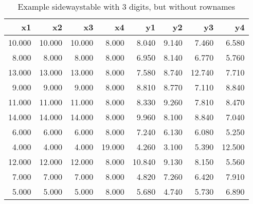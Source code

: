 \documentclass[10pt, fullpage, a4paper, titlepage]{article}
\begin{document}
 
\begin{sidewaystable}[ht]
\centering
\begin{tabular}{rrrrrrrr}
  \hline
x1 & x2 & x3 & x4 & y1 & y2 & y3 & y4 \\ 
  \hline
10.000 & 10.000 & 10.000 & 8.000 & 8.040 & 9.140 & 7.460 & 6.580 \\ 
  8.000 & 8.000 & 8.000 & 8.000 & 6.950 & 8.140 & 6.770 & 5.760 \\ 
  13.000 & 13.000 & 13.000 & 8.000 & 7.580 & 8.740 & 12.740 & 7.710 \\ 
  9.000 & 9.000 & 9.000 & 8.000 & 8.810 & 8.770 & 7.110 & 8.840 \\ 
  11.000 & 11.000 & 11.000 & 8.000 & 8.330 & 9.260 & 7.810 & 8.470 \\ 
  14.000 & 14.000 & 14.000 & 8.000 & 9.960 & 8.100 & 8.840 & 7.040 \\ 
  6.000 & 6.000 & 6.000 & 8.000 & 7.240 & 6.130 & 6.080 & 5.250 \\ 
  4.000 & 4.000 & 4.000 & 19.000 & 4.260 & 3.100 & 5.390 & 12.500 \\ 
  12.000 & 12.000 & 12.000 & 8.000 & 10.840 & 9.130 & 8.150 & 5.560 \\ 
  7.000 & 7.000 & 7.000 & 8.000 & 4.820 & 7.260 & 6.420 & 7.910 \\ 
  5.000 & 5.000 & 5.000 & 8.000 & 5.680 & 4.740 & 5.730 & 6.890 \\ 
   \hline
\end{tabular}
\caption{Example sidewaystable with 3 digits, but without rownames} 
\label{ACtable3norow}
\end{sidewaystable}
\end{document}
